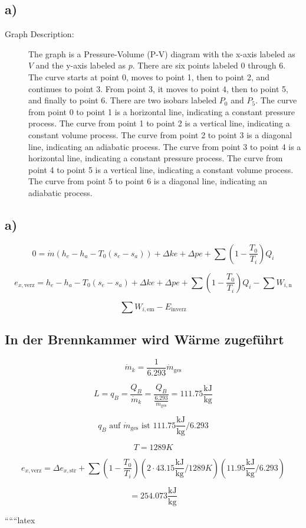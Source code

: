 

\subsection*{a)}

\begin{description}
    \item[Graph Description:] The graph is a Pressure-Volume (P-V) diagram with the x-axis labeled as $V$ and the y-axis labeled as $p$. There are six points labeled 0 through 6. The curve starts at point 0, moves to point 1, then to point 2, and continues to point 3. From point 3, it moves to point 4, then to point 5, and finally to point 6. There are two isobars labeled $P_0$ and $P_5$. The curve from point 0 to point 1 is a horizontal line, indicating a constant pressure process. The curve from point 1 to point 2 is a vertical line, indicating a constant volume process. The curve from point 2 to point 3 is a diagonal line, indicating an adiabatic process. The curve from point 3 to point 4 is a horizontal line, indicating a constant pressure process. The curve from point 4 to point 5 is a vertical line, indicating a constant volume process. The curve from point 5 to point 6 is a diagonal line, indicating an adiabatic process.
\end{description}



\subsection*{a)}

\[
0 = \dot{m}(h_e - h_a - T_0(s_e - s_a)) + \Delta ke + \Delta pe + \sum \left(1 - \frac{T_0}{T_i}\right) Q_i
\]

\[
e_{x, \text{verz}} = h_e - h_a - T_0(s_e - s_a) + \Delta ke + \Delta pe + \sum \left(1 - \frac{T_0}{T_i}\right) Q_i - \sum W_{i, \text{n}}
\]

\[
\sum W_{i, \text{em}} - E_{\text{inverz}}
\]

\subsection*{In der Brennkammer wird Wärme zugeführt}

\[
\dot{m}_k = \frac{1}{6.293} \dot{m}_{\text{ges}}
\]

\[
L = q_B = \frac{Q_B}{\dot{m}_k} = \frac{Q_B}{\frac{6.293}{\dot{m}_{\text{ges}}}} = 111.75 \frac{\text{kJ}}{\text{kg}}
\]

\[
q_B \text{ auf } \dot{m}_{\text{ges}} \text{ ist } 111.75 \frac{\text{kJ}}{\text{kg}} / 6.293
\]

\[
T = 1289 K
\]

\[
e_{x, \text{verz}} = \Delta e_{x, \text{str}} + \sum \left(1 - \frac{T_0}{T_i}\right) \left(2 \cdot 43.15 \frac{\text{kJ}}{\text{kg}} / 1289 K\right) \left(11.95 \frac{\text{kJ}}{\text{kg}} / 6.293\right)
\]

\[
= 254.073 \frac{\text{kJ}}{\text{kg}}
\]

``````latex